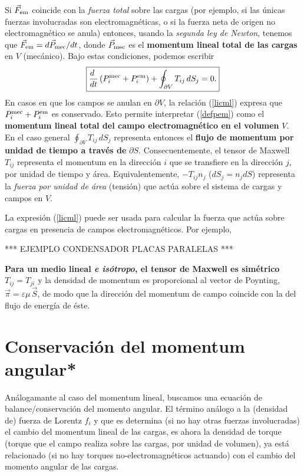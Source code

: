 Si $\vec{F}_{\rm em}$ coincide con la \textit{fuerza total} sobre las cargas (por ejemplo, si las únicas fuerzas involucradas son electromagnéticas, o si la fuerza neta de origen no electromagnético se anula) entonces, usando la \textit{segunda ley de Newton}, tenemos que $\vec{F}_{\rm em}=d\vec{P}_{\rm mec}/dt$, donde $\vec{P}_{\rm mec}$ es el \textbf{momentum lineal total de las cargas} en $V$ (mecánico). Bajo estas condiciones, podemos escribir
\begin{equation}
\boxed{\frac{d\ }{dt}\left(P_i^{\rm mec}+P_i^{\rm em}\right)+\oint_{\partial
V}T_{ij}\,dS_j =0.} \label{licml}
\end{equation}
En casos en que los campos se anulan en $\partial V$, la relación
(\ref{licml}) expresa que $P_i^{\rm mec}+P_i^{\rm em}$ es conservado. Esto
permite interpretar (\ref{defpem}) como el \textbf{momentum lineal total del
campo electromagnético en el volumen} $V$. En el caso general $\oint_{\partial
V}T_{ij}\,dS_j $ representa entonces el \textbf{flujo de momentum por unidad de tiempo
a través de} $\partial S$. Consecuentemente, el tensor de Maxwell $T_{ij}$
representa el momentum en la dirección $i$ que se transfiere en la dirección
$j$, por unidad de tiempo y área. Equivalentemente, $-T_{ij}n_j$ ($dS_j=n_jdS$)
representa la \textit{fuerza por unidad de área} (tensión) que actúa sobre el sistema
de cargas y campos en $V$.

La expresión (\ref{licml}) puede ser usada para calcular la fuerza que actúa
sobre cargas en presencia de campos electromagnéticos. Por ejemplo,

\begin{center}
*** EJEMPLO CONDENSADOR PLACAS PARALELAS ***
\end{center}

\textbf{Para un medio lineal \textit{e isótropo}, el tensor de Maxwell es simétrico
$T_{ij}=T_{ji}$} y la densidad de momentum es proporcional al vector de
Poynting, $\vec{\pi}=\varepsilon\mu\,\vec{S}$, de modo que la dirección del
momentum de campo coincide con la del flujo de energía de
éste.

\section{Conservación del momentum angular*}\label{sec:momentum_angular}
Análogamante al caso del momentum lineal, buscamos una ecuación de balance/conservación del momento angular. El término análogo a la (densidad de) fuerza de Lorentz $f_i$ y que es determina (si no hay otras fuerzas involucradas) el cambio del momentum lineal de las cargas, es ahora la densidad de torque (torque que el campo realiza sobre las cargas, por unidad de volumen), ya está relacionado (si no hay torques no-electromagnéticos actuando) con el cambio del momento angular de las cargas.

